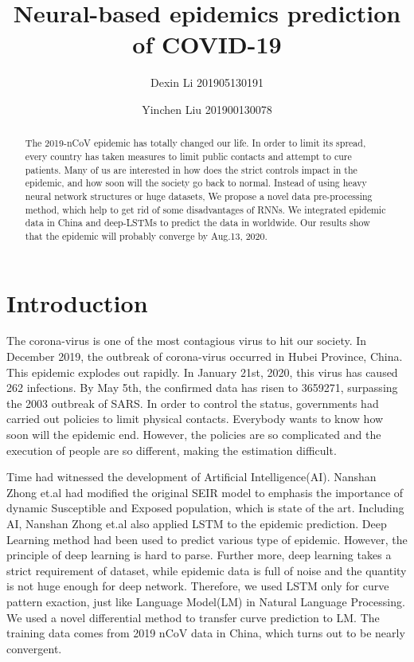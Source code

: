 \documentclass[]{article}
\title{Neural-based epidemics prediction of COVID-19}
\author{Dexin Li 201905130191}
\author{Yinchen Liu 201900130078}
\affil[1]{Shandong University\\School of Computer Science}
\begin{document}
	

\maketitle

\begin{abstract}
\par
The 2019-nCoV epidemic has totally changed our life. In order to limit its spread, every country has taken measures to limit public contacts and attempt to cure patients. Many of us are interested in how does the strict controls impact in the epidemic, and how soon will the society go back to normal. Instead of using heavy neural network structures or huge datasets, We propose a novel data pre-processing method, which help to get rid of some disadvantages of RNNs. We integrated epidemic data in China and deep-LSTMs to predict the data in worldwide. Our results show that the epidemic will probably converge by Aug.13, 2020.
\end{abstract}

\section{Introduction}
\par
The corona-virus is one of the most contagious virus to hit our society. In December 2019, the outbreak of corona-virus occurred in Hubei Province, China. This epidemic explodes out rapidly. In January 21st, 2020, this virus has caused 262 infections. By May 5th, the confirmed data has risen to 3659271, surpassing the 2003 outbreak of SARS. In order to control the status, governments had carried out policies to limit physical contacts. Everybody wants to know how soon will the epidemic end. However, the policies are so complicated and the execution of people are so different, making the estimation difficult.
\par
Time had witnessed the development of Artificial Intelligence(AI). Nanshan Zhong et.al\cite{JTD36385} had modified the original SEIR model to emphasis the importance of dynamic Susceptible and Exposed population, which is state of the art. Including AI, Nanshan Zhong et.al also applied LSTM to the epidemic prediction. Deep Learning method had been used to predict various type of epidemic\cite{Liu2017Predicting}. However, the principle of deep learning is hard to parse. Further more, deep learning takes a strict requirement of dataset, while epidemic data is full of noise and the quantity is not huge enough for deep network. Therefore, we used LSTM only for curve pattern exaction, just like Language Model(LM) in Natural Language Processing. We used a novel differential method to transfer curve prediction to LM. The training data comes from 2019 nCoV data in China, which turns out to be nearly convergent.
\end{document}
